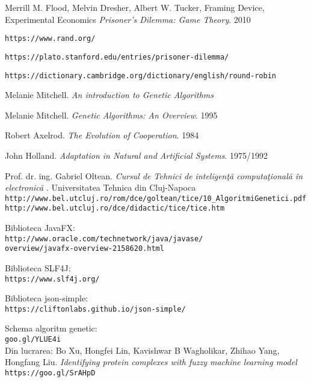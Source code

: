 \begin{thebibliography}{99}
	
Merrill M. Flood, Melvin Dresher, Albert W. Tucker, Framing Device, Experimental Economics
\textit{Prisoner's Dilemma: Game Theory}. 2010

\texttt{https://www.rand.org/}

\texttt{https://plato.stanford.edu/entries/prisoner-dilemma/}

\texttt{https://dictionary.cambridge.org/dictionary/english/round-robin}

Melanie Mitchell.
\textit{An introduction to Genetic Algorithms}

Melanie Mitchell. 
\textit{Genetic Algorithms: An Overview}. 1995

Robert Axelrod.
\textit{The Evolution of Cooperation}. 1984

John Holland. 
\textit{Adaptation in Natural and Artificial Systems}. 1975/1992

Prof. dr. ing. Gabriel Oltean.
\textit{Cursul de Tehnici de inteligenţă computaţională în electronică}
. Universitatea Tehnica din Cluj-Napoca
\\\texttt{http://www.bel.utcluj.ro/rom/dce/goltean/tice/10\_AlgoritmiGenetici.pdf}
\\\texttt{http://www.bel.utcluj.ro/dce/didactic/tice/tice.htm}

Biblioteca JavaFX:\\
\texttt{http://www.oracle.com/technetwork/java/javase/}\\
\texttt{overview/javafx-overview-2158620.html}

Biblioteca SLF4J:\\
\texttt{https://www.slf4j.org/}

Biblioteca json-simple:\\
\texttt{https://cliftonlabs.github.io/json-simple/}

Schema algoritm genetic:
\\\texttt{goo.gl/YLUE4i}\\
Din lucrarea: Bo Xu, Hongfei Lin, Kavishwar B Wagholikar, Zhihao Yang, Hongfang Liu. \textit{Identifying protein complexes with fuzzy machine learning model}
\\\texttt{https://goo.gl/SrAHpD} 


\end{thebibliography}
